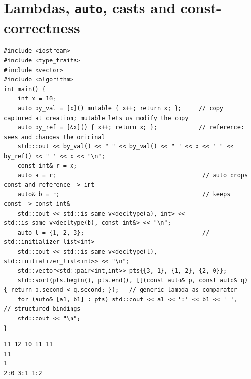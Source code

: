 \documentclass[10pt,a4paper,openany,oneside]{report}
\newcommand{\prio}[1]{\texorpdfstring{\ifcase#1\or{\color{gold}\ding{72}}\or{\color{gold}\ding{72}\ding{72}}\or{\color{gold}\ding{72}\ding{72}\ding{72}}\fi}{}}
\begin{document}
\section{Lambdas, \texttt{auto}, casts and const-correctness \prio{2}}
\begin{lstlisting}[language={[11]C++},title={Lambda captures; auto deduction}]
#include <iostream>
#include <type_traits>
#include <vector>
#include <algorithm>
int main() {
    int x = 10;
    auto by_val = [x]() mutable { x++; return x; };     // copy captured at creation; mutable lets us modify the copy
    auto by_ref = [&x]() { x++; return x; };            // reference: sees and changes the original
    std::cout << by_val() << " " << by_val() << " " << x << " " << by_ref() << " " << x << "\n";
    const int& r = x;
    auto a = r;                                          // auto drops const and reference -> int
    auto& b = r;                                         // keeps const -> const int&
    std::cout << std::is_same_v<decltype(a), int> << std::is_same_v<decltype(b), const int&> << "\n";
    auto l = {1, 2, 3};                                  // std::initializer_list<int>
    std::cout << std::is_same_v<decltype(l), std::initializer_list<int>> << "\n";
    std::vector<std::pair<int,int>> pts{{3, 1}, {1, 2}, {2, 0}};
    std::sort(pts.begin(), pts.end(), [](const auto& p, const auto& q) { return p.second < q.second; });   // generic lambda as comparator
    for (auto& [a1, b1] : pts) std::cout << a1 << ':' << b1 << ' ';                             // structured bindings
    std::cout << "\n";
}
\end{lstlisting}
\begin{lstlisting}[style=out,title={Answer: captured output}]
11 12 10 11 11
11
1
2:0 3:1 1:2 
\end{lstlisting}
\end{document}

